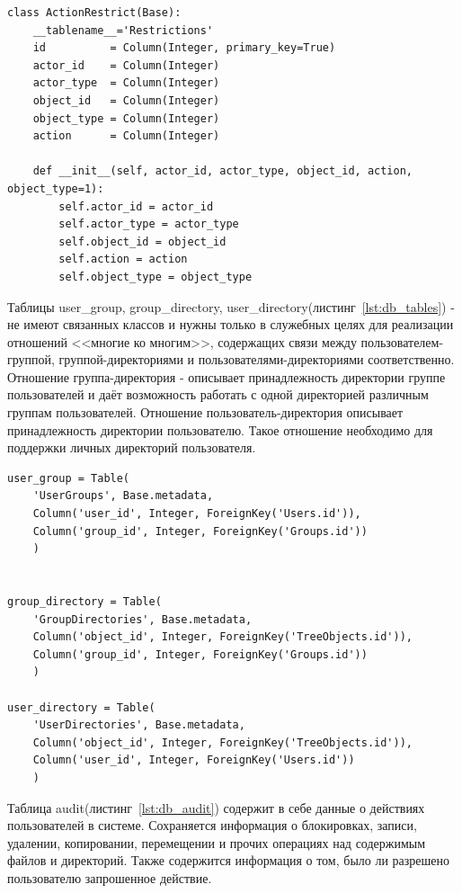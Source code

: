 \documentclass[utf8,usehyperref,12pt]{G7-32}
\begin{document}
\lstset{language=Python,caption=Права доступа,label=lst:db_action_restrict}
\begin{lstlisting}  
class ActionRestrict(Base):
    __tablename__='Restrictions'
    id          = Column(Integer, primary_key=True)
    actor_id    = Column(Integer)
    actor_type  = Column(Integer)    
    object_id   = Column(Integer)
    object_type = Column(Integer)
    action      = Column(Integer)    

    def __init__(self, actor_id, actor_type, object_id, action, object_type=1):
        self.actor_id = actor_id
        self.actor_type = actor_type
        self.object_id = object_id
        self.action = action
        self.object_type = object_type       
\end{lstlisting}

Таблицы user\_group, group\_directory, user\_directory(листинг~\ref{lst:db_tables}) - не имеют связанных классов и нужны только в служебных целях для реализации отношений <<многие ко многим>>, содержащих связи между пользователем-группой, группой-директориями и пользователями-директориями соответственно. 
Отношение группа-директория - описывает принадлежность директории группе пользователей и даёт возможность работать с одной директорией различным группам пользователей. 
Отношение пользователь-директория описывает принадлежность директории пользователю. Такое отношение необходимо для поддержки личных директорий пользователя.

\lstset{language=Python,caption=Вспомогательные таблицы,label=lst:db_tables}
\begin{lstlisting}  
user_group = Table(
    'UserGroups', Base.metadata,    
    Column('user_id', Integer, ForeignKey('Users.id')),
    Column('group_id', Integer, ForeignKey('Groups.id'))
    )
    
    
group_directory = Table(
    'GroupDirectories', Base.metadata,    
    Column('object_id', Integer, ForeignKey('TreeObjects.id')),
    Column('group_id', Integer, ForeignKey('Groups.id'))
    )
    
user_directory = Table(
    'UserDirectories', Base.metadata,    
    Column('object_id', Integer, ForeignKey('TreeObjects.id')),
    Column('user_id', Integer, ForeignKey('Users.id'))
    )
\end{lstlisting}

Таблица audit(листинг~\ref{lst:db_audit}) содержит в себе данные о действиях пользователей в системе. Сохраняется информация о блокировках, записи, удалении, копировании, перемещении и прочих операциях над содержимым файлов и директорий. Также содержится информация о том, было ли разрешено пользователю запрошенное действие.
\end{document}
